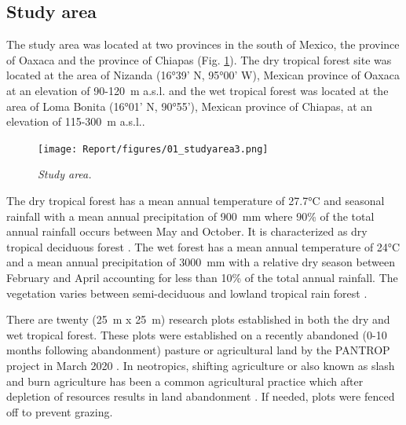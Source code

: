 

\subsection{Study area}
The study area was located at two provinces in the south of Mexico, the province of Oaxaca and the province of Chiapas (Fig. \ref{fig:sa}). The dry tropical forest site was located at the area of Nizanda (16°39' N, 95°00' W), Mexican province of Oaxaca at an elevation of 90-120~m a.s.l. and the wet tropical forest was located at the area of Loma Bonita (16°01' N, 90°55'), Mexican province of Chiapas, at an elevation of 115-300~m a.s.l.. 

\begin{figure}[htbp]
\centering
\texttt{[image: Report/figures/01\_studyarea3.png]}
\caption{\textit{Study area.}}
\label{fig:sa}
\end{figure}

The dry tropical forest has a mean annual temperature of 27.7°C and seasonal rainfall with a mean annual precipitation of 900~mm where 90\% of the total annual rainfall occurs between May and October. It is characterized as dry tropical deciduous forest \citep{hordijkLandUseHistory2024}. The wet forest has a mean annual temperature of 24°C and a mean annual precipitation of 3000~mm with a relative dry season between February and April accounting for less than 10\% of the total annual rainfall. The vegetation varies between semi-deciduous and lowland tropical rain forest \citep{hordijkLandUseHistory2024}.

There are twenty (25~m x 25~m) research plots established in both the dry and wet tropical forest. These plots were established on a recently abandoned (0-10 months following abandonment) pasture or agricultural land by the PANTROP project in March 2020 \citep{hordijkLandUseHistory2024}. In neotropics, shifting agriculture or also known as slash and burn agriculture has been a common agricultural practice which after depletion of resources results in land abandonment \citep{jakovacRoleLanduseHistory2021}. If needed, plots were fenced off to prevent grazing. 

